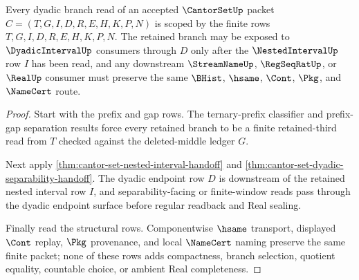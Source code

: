 \begin{theorem}
\label{thm:cantorset-scoped-dyadic-branch-route}
Every dyadic branch read of an accepted $\CantorSetUp$ packet $C=(T,G,I,D,R,E,H,K,P,N)$ is scoped by the finite rows $T,G,I,D,R,E,H,K,P,N$. The retained branch may be exposed to $\DyadicIntervalUp$ consumers through $D$ only after the $\NestedIntervalUp$ row $I$ has been read, and any downstream $\StreamNameUp$, $\RegSeqRatUp$, or $\RealUp$ consumer must preserve the same $\BHist$, $\hsame$, $\Cont$, $\Pkg$, and $\NameCert$ route.
\end{theorem}
\begin{proof}
Start with the prefix and gap rows. The ternary-prefix classifier and prefix-gap separation results force every retained branch to be a finite retained-third read from $T$ checked against the deleted-middle ledger $G$.

Next apply \autoref{thm:cantor-set-nested-interval-handoff} and \autoref{thm:cantor-set-dyadic-separability-handoff}. The dyadic endpoint row $D$ is downstream of the retained nested interval row $I$, and separability-facing or finite-window reads pass through the dyadic endpoint surface before regular readback and Real sealing.

Finally read the structural rows. Componentwise $\hsame$ transport, displayed $\Cont$ replay, $\Pkg$ provenance, and local $\NameCert$ naming preserve the same finite packet; none of these rows adds compactness, branch selection, quotient equality, countable choice, or ambient Real completeness.
\end{proof}

